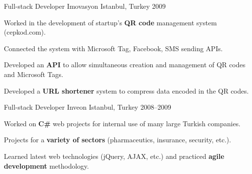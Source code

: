 \begin{cventries}
  \cventry
    {Full-stack Developer} %
    {Imovasyon} %
    {Istanbul, Turkey} %
    {2009} %
    {
      \begin{cvitems} %
        \item {Worked in the development of startup's \textbf{QR code} management system (cepkod.com).}
        \item {Connected the system with Microsoft Tag, Facebook, SMS sending APIs.}
        \item {Developed an \textbf{API} to allow simultaneous creation and management of QR codes and Microsoft Tags.}
        \item {Developed a \textbf{URL shortener} system to compress data encoded in the QR codes.}
      \end{cvitems}
    }

  \cventry
    {Full-stack Developer} %
    {Inveon} %
    {Istanbul, Turkey} %
    {2008--2009} %
    {
      \begin{cvitems} %
        \item {Worked on \textbf{C\#} web projects for internal use of many large Turkish companies.}
        \item {Projects for a \textbf{variety of sectors} (pharmaceutics, insurance, security, etc.).}
        \item {Learned latest web technologies (jQuery, AJAX, etc.) and practiced \textbf{agile development} methodology.}
      \end{cvitems}
    }

\end{cventries}
